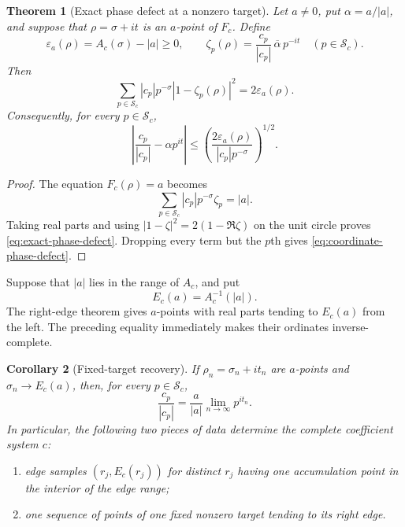 \documentclass[11pt]{article}
\newtheorem{theorem}{Theorem}[section]
\newtheorem{corollary}[theorem]{Corollary}
\theoremstyle{definition}
\theoremstyle{remark}
\newcommand{\eps}{\varepsilon}
\begin{document}
\begin{theorem}[Exact phase defect at a nonzero target]
\label{thm:exact-phase-defect}
Let $a\ne0$, put $\alpha=a/|a|$, and suppose that
$\rho=\sigma+it$ is an $a$-point of $F_c$.  Define
\[
 \eps_a(\rho)=A_c(\sigma)-|a|\ge0,
 \qquad
 \zeta_p(\rho)=\frac{c_p}{|c_p|}\,\overline\alpha\,p^{-it}
 \quad(p\in\mathcal S_c).
\]
Then
\begin{equation}
 \boxed{
 \sum_{p\in\mathcal S_c}|c_p|p^{-\sigma}
       |1-\zeta_p(\rho)|^2=2\eps_a(\rho).}
 \label{eq:exact-phase-defect}
\end{equation}
Consequently, for every $p\in\mathcal S_c$,
\begin{equation}
 \left|\frac{c_p}{|c_p|}-\alpha p^{it}\right|
 \le
 \left(\frac{2\eps_a(\rho)}{|c_p|p^{-\sigma}}\right)^{1/2}.
 \label{eq:coordinate-phase-defect}
\end{equation}
\end{theorem}

\begin{proof}
The equation $F_c(\rho)=a$ becomes
\[
 \sum_{p\in\mathcal S_c}|c_p|p^{-\sigma}\zeta_p=|a|.
\]
Taking real parts and using $|1-\zeta|^2=2(1-\Re\zeta)$ on the
unit circle proves \eqref{eq:exact-phase-defect}.  Dropping every term but
the $p$th gives \eqref{eq:coordinate-phase-defect}.
\end{proof}

Suppose that $|a|$ lies in the range of $A_c$, and put
\[
 E_c(a)=A_c^{-1}(|a|).
\]
The right-edge theorem gives $a$-points with real parts tending to
$E_c(a)$ from the left.  The preceding equality immediately makes their
ordinates inverse-complete.

\begin{corollary}[Fixed-target recovery]
\label{cor:fixed-target-recovery}
If $\rho_n=\sigma_n+it_n$ are $a$-points and
$\sigma_n\to E_c(a)$, then, for every $p\in\mathcal S_c$,
\begin{equation}
 \boxed{
 \frac{c_p}{|c_p|}=\frac a{|a|}\lim_{n\to\infty}p^{it_n}.}
 \label{eq:fixed-target-recovery}
\end{equation}
In particular, the following two pieces of data determine the complete
coefficient system $c$:
\begin{enumerate}[label=\textup{(\roman*)}]
 \item edge samples $(r_j,E_c(r_j))$ for distinct $r_j$ having one
       accumulation point in the interior of the edge range;
 \item one sequence of points of one fixed nonzero target tending to its
       right edge.
\end{enumerate}
\end{corollary}
\end{document}
